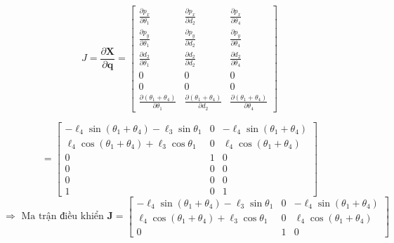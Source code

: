 \[
J = \frac{\partial \mathbf{X}}{\partial \mathbf{q}} =
\begin{bmatrix}
\frac{\partial p_x}{\partial \theta_1} & \frac{\partial p_x}{\partial d_2} & \frac{\partial p_x}{\partial \theta_4} \\
\frac{\partial p_y}{\partial \theta_1} & \frac{\partial p_y}{\partial d_2} & \frac{\partial p_y}{\partial \theta_4} \\
\frac{\partial d_2}{\partial \theta_1} & \frac{\partial d_2}{\partial d_2} & \frac{\partial d_2}{\partial \theta_4} \\
0 & 0 & 0 \\
0 & 0 & 0 \\
\frac{\partial (\theta_1 + \theta_4)}{\partial \theta_1} & \frac{\partial (\theta_1 + \theta_4)}{\partial d_2} & \frac{\partial (\theta_1 + \theta_4)}{\partial \theta_4}
\end{bmatrix}
\]

\[
=
\begin{bmatrix}
-\ell_4 \sin(\theta_1 + \theta_4) - \ell_3 \sin\theta_1 & 0 & -\ell_4 \sin(\theta_1 + \theta_4) \\
\ell_4 \cos(\theta_1 + \theta_4) + \ell_3 \cos\theta_1 & 0 & \ell_4 \cos(\theta_1 + \theta_4) \\
0 & 1 & 0 \\
0 & 0 & 0 \\
0 & 0 & 0 \\
1 & 0 & 1
\end{bmatrix}
\]
\[
\Rightarrow \text{ Ma trận điều khiển } \mathbf{J} = 
\begin{bmatrix}
-\ell_4 \sin(\theta_1 + \theta_4) - \ell_3 \sin \theta_1 & 0 & -\ell_4 \sin(\theta_1 + \theta_4) \\
\ell_4 \cos(\theta_1 + \theta_4) + \ell_3 \cos \theta_1 & 0 & \ell_4 \cos(\theta_1 + \theta_4) \\
0 & 1 & 0
\end{bmatrix}
\]
